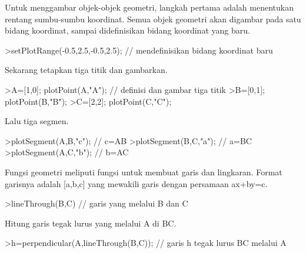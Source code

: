 \documentclass[12pt,arial,letterpaper]{book}
\begin{document}
\begin{eulercomment}
\begin{eulercomment}
\begin{eulercomment}
\begin{eulercomment}
\begin{eulercomment}
\begin{eulercomment}
\begin{eulercomment}
\begin{eulercomment}
\begin{eulercomment}
\begin{eulercomment}
\begin{eulercomment}
\begin{eulercomment}
\begin{eulercomment}
\begin{eulercomment}
\begin{eulercomment}
\begin{eulercomment}
\begin{eulercomment}
\begin{eulercomment}
\begin{eulercomment}
\begin{eulercomment}
\begin{eulercomment}
\begin{eulercomment}
\begin{eulercomment}
\begin{eulercomment}
\begin{eulercomment}
\end{eulercomment}
\begin{eulercomment}
Untuk menggambar objek-objek geometri, langkah pertama adalah
menentukan rentang sumbu-sumbu koordinat. Semua objek geometri akan
digambar pada satu bidang koordinat, sampai didefinisikan bidang
koordinat yang baru.
\end{eulercomment}
\begin{eulerprompt}
>setPlotRange(-0.5,2.5,-0.5,2.5); // mendefinisikan bidang koordinat baru 
\end{eulerprompt}
\begin{eulercomment}
Sekarang tetapkan tiga titik dan gambarkan.
\end{eulercomment}
\begin{eulerprompt}
>A=[1,0]; plotPoint(A,"A"); // definisi dan gambar tiga titik
>B=[0,1]; plotPoint(B,"B");
>C=[2,2]; plotPoint(C,"C");
\end{eulerprompt}
\begin{eulercomment}
Lalu tiga segmen.
\end{eulercomment}
\begin{eulerprompt}
>plotSegment(A,B,"c"); // c=AB
>plotSegment(B,C,"a"); // a=BC
>plotSegment(A,C,"b"); // b=AC
\end{eulerprompt}
\begin{eulercomment}
Fungsi geometri meliputi fungsi untuk membuat garis dan lingkaran.
Format garisnya adalah [a,b,c] yang mewakili garis dengan persamaan
ax+by=c.
\end{eulercomment}
\begin{eulerprompt}
>lineThrough(B,C) // garis yang melalui B dan C
\end{eulerprompt}
\begin{euleroutput}
  [-1,  2,  2]
\end{euleroutput}
\begin{eulercomment}
Hitung garis tegak lurus yang melalui A di BC.
\end{eulercomment}
\begin{eulerprompt}
>h=perpendicular(A,lineThrough(B,C)); // garis h tegak lurus BC melalui A
\end{eulerprompt}
\begin{eulercomment}

\end{eulercomment}
\end{eulercomment}
\end{eulercomment}
\end{eulercomment}
\end{eulercomment}
\end{eulercomment}
\end{eulercomment}
\end{eulercomment}
\end{eulercomment}
\end{eulercomment}
\end{eulercomment}
\end{eulercomment}
\end{eulercomment}
\end{eulercomment}
\end{eulercomment}
\end{eulercomment}
\end{eulercomment}
\end{eulercomment}
\end{eulercomment}
\end{eulercomment}
\end{eulercomment}
\end{eulercomment}
\end{eulercomment}
\end{eulercomment}
\end{eulercomment}
\end{document}
